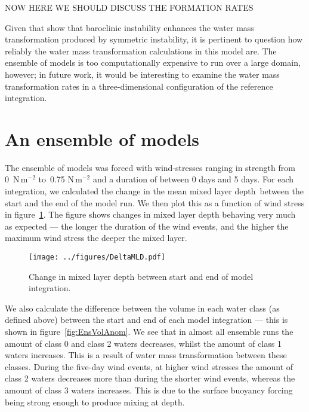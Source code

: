 NOW HERE WE SHOULD DISCUSS THE FORMATION RATES

Given that \citet{Spall2016} show that baroclinic instability enhances the water mass transformation produced by symmetric instability, it is pertinent to question how reliably the water mass transformation calculations in this model are. The ensemble of models is too computationally expensive to run over a large domain, however; in future work, it would be interesting to examine the water mass transformation rates in a three-dimensional configuration of the reference integration.



\section{An ensemble of models}
\label{sec:IrmEns}
The ensemble of models was forced with wind-stresses ranging in strength from 0~N\,m$^{-2}$ to~0.75 N\,m$^{-2}$ and a duration of between 0 days and 5 days. For each integration, we calculated the change in the mean mixed layer depth\footnotemark~between the start and the end of the model run. We then plot this as a function of wind stress in figure~\ref{fig:DeltaMLD}. The figure shows changes in mixed layer depth behaving very much as expected --- the longer the duration of the wind events, and the higher the maximum wind stress the deeper the mixed layer.

\begin{figure} 
    \centering
    \texttt{[image: ../figures/DeltaMLD.pdf]}
    \caption{Change in mixed layer depth between start and end of model integration.}
    \label{fig:DeltaMLD}
\end{figure}

We also calculate the difference between the volume in each water class (as defined above) between the start and end of each model integration --- this is shown in figure~\ref{fig:EnsVolAnom}. We see that in almost all ensemble runs the amount of class 0 and class 2 waters decreases, whilst the amount of class 1 waters increases. This is a result of water mass transformation between these classes. During the five-day wind events, at higher wind stresses the amount of class 2 waters decreases more than during the shorter wind events, whereas the amount of class 3 waters increases. This is due to the surface buoyancy forcing being strong enough to produce mixing at depth.


